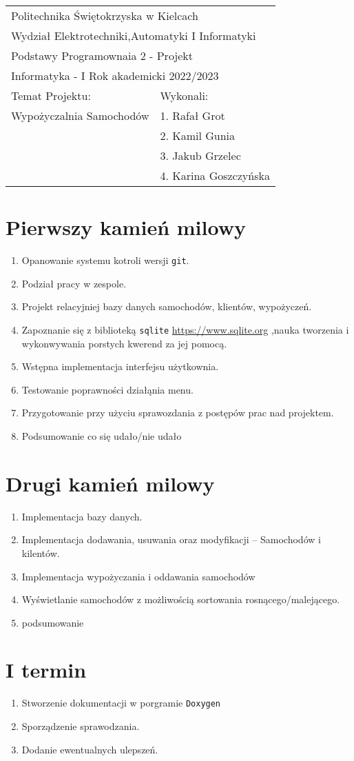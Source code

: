 \documentclass[11pt]{article}
\author{placeholder}
\date{\today}
\title{}
\begin{document}
\begin{center}
\begin{tabular}{|l|l|}
\hline
\multicolumn{2}{|l|}{Politechnika Świętokrzyska w Kielcach} \\
\multicolumn{2}{|l|}{Wydział Elektrotechniki,Automatyki I Informatyki} \\
\hline
\multicolumn{2}{|l|}{Podstawy Programownaia 2 - Projekt} \\
\multicolumn{2}{|l|}{Informatyka - I Rok akademicki 2022/2023} \\
\hline
Temat Projektu: & Wykonali: \\
Wypożyczalnia Samochodów & 1. Rafał Grot \\
 & 2. Kamil Gunia \\
 & 3. Jakub Grzelec \\
 & 4. Karina Goszczyńska \\
\hline
\end{tabular}
\end{center}
\section{Pierwszy kamień milowy}
\label{sec:org5c5810a}
\begin{enumerate}
\item Opanowanie systemu kotroli wersji \texttt{git}.
\item Podział pracy w zespole.
\item Projekt relacyjniej bazy danych samochodów, klientów, wypożyczeń.
\item Zapoznanie się z biblioteką \texttt{sqlite} \url{https://www.sqlite.org} ,nauka tworzenia i wykonwywania porstych kwerend za jej pomocą.
\item Wstępna implementacja interfejsu użytkownia.
\item Testowanie poprawności działąnia menu.
\item Przygotowanie przy użyciu sprawozdania z postępów prac nad projektem.
\item Podsumowanie co się udało/nie udało
\end{enumerate}
\section{Drugi kamień milowy}
\begin{enumerate}
\item Implementacja bazy danych.
\item Implementacja dodawania, usuwania oraz modyfikacji -- Samochodów i kilentów.
\item Implementacja wypożyczania i oddawania samochodów
\item Wyświetlanie samochodów z możliwością sortowania rosnącego/malejącego.
\item podsumowanie
\end{enumerate}
\section{I termin}
\begin{enumerate}
\item Stworzenie dokumentacji w porgramie \texttt{Doxygen}
\item Sporządzenie sprawodzania.
\item Dodanie ewentualnych ulepszeń.
\end{enumerate}
\end{document}

